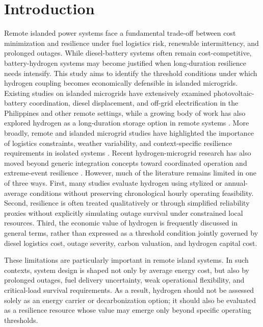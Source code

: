 \documentclass[preprint,12pt]{elsarticle}
\begin{document}
\section{Introduction}
Remote islanded power systems face a fundamental trade-off between cost minimization and resilience under fuel logistics risk, renewable intermittency, and prolonged outages. While diesel-battery systems often remain cost-competitive, battery-hydrogen systems may become justified when long-duration resilience needs intensify. This study aims to identify the threshold conditions under which hydrogen coupling becomes economically defensible in islanded microgrids.
Existing studies on islanded microgrids have extensively examined photovoltaic-battery coordination, diesel displacement, and off-grid electrification in the Philippines and other remote settings, while a growing body of work has also explored hydrogen as a long-duration storage option in remote systems \cite{ocon_bertheau_2019_philippines_diesel_pvbatt,pascasio_2021_philippines_pv_wind,castro_2022_634_islands_hres,castro_2023_busuanga_resilience,castro_2024_208_islands_transition,salac_2024_philippines_offgrid_review,alzahrani_2022_hydrogen_microgrid_review,van_2023_hydrogen_microgrid_review,tatti_2024_hydrogen_offgrid_case}. More broadly, remote and islanded microgrid studies have highlighted the importance of logistics constraints, weather variability, and context-specific resilience requirements in isolated systems \cite{hirsch_2018_microgrids_review,akinyele_2018_remote_microgrid_challenges}. Recent hydrogen-microgrid research has also moved beyond generic integration concepts toward coordinated operation and extreme-event resilience \cite{huang_2023_economic_resilient_h2_microgrid,shahbazbegian_2023_resilience_p2h,sharifpour_2023_hydrogen_extreme_events,qi_2025_h2_battery_dispatch}. However, much of the literature remains limited in one of three ways. First, many studies evaluate hydrogen using stylized or annual-average conditions without preserving chronological hourly operating feasibility. Second, resilience is often treated qualitatively or through simplified reliability proxies without explicitly simulating outage survival under constrained local resources. Third, the economic value of hydrogen is frequently discussed in general terms, rather than expressed as a threshold condition jointly governed by diesel logistics cost, outage severity, carbon valuation, and hydrogen capital cost.

These limitations are particularly important in remote island systems. In such contexts, system design is shaped not only by average energy cost, but also by prolonged outages, fuel delivery uncertainty, weak operational flexibility, and critical-load survival requirements. As a result, hydrogen should not be assessed solely as an energy carrier or decarbonization option; it should also be evaluated as a resilience resource whose value may emerge only beyond specific operating thresholds.
\end{document}
